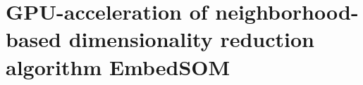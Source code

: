 





\chapter{GPU-acceleration of neighborhood-based dimensionality reduction algorithm EmbedSOM}












%   

